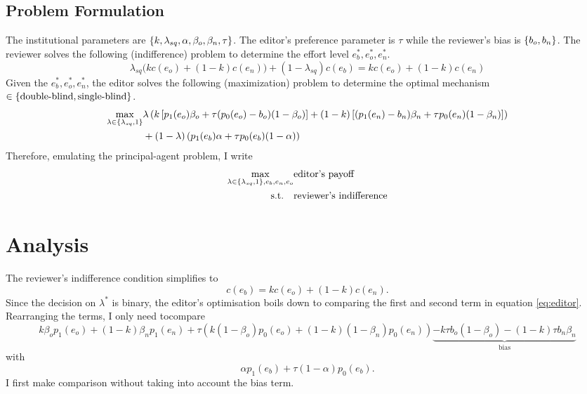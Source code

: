 \documentclass[12pt]{article}
\begin{document}
\subsection{Problem Formulation}
The institutional parameters are
$\left\{k,\lambda_{sq},\alpha,\beta_o,\beta_n,\tau\right\}$. The editor's preference
parameter is $\tau$ while the reviewer's bias is $\left\{b_o,b_n\right\}$. The reviewer
solves the following (indifference) problem to determine the effort level
$e_b^*,e_o^*,e_n^*$.
\begin{equation}
    \lambda_{sq} \big(k c(e_o) + (1-k) c(e_n)\big) + (1-\lambda_{sq}) c(e_b) = {k c(e_o) + (1-k) c(e_n)}
\end{equation}
Given the $e_b^*,e_o^*,e_n^*$, the editor solves the following (maximization)
problem to determine the optimal mechanism $\in
    \left\{\text{double-blind},\text{single-blind}\right\}$.
\begin{equation}
    \begin{split}\label{eq:editor}
        \max_{\lambda \in \left\{\lambda_{sq},1\right\}} & \lambda\left(k \left[p_1(e_o)\beta_o+\tau (p_0(e_o)-b_o)(1-\beta_o)\right]+(1-k)\left[(p_1(e_n)-b_n)\beta_n+\tau p_0(e_n)(1-\beta_n)\right] \right) \\
                                                & +(1-\lambda)\left(p_1(e_b)\alpha+\tau p_0(e_b)(1-\alpha)\right)                                                                       \\
    \end{split}
\end{equation}
Therefore, emulating the principal-agent problem, I write
\begin{equation}\label{eq:combined}
    \begin{split}
        \max_{\lambda \in \left\{\lambda_{sq},1\right\},e_b,e_n,e_o} & \text{editor's payoff}         \\
        \text{s.t.} \quad                                   & \text{reviewer's indifference}
    \end{split}
\end{equation}

\section{Analysis} \label{sec:analysis}
The reviewer's indifference condition simplifies to
\begin{equation*}
    c(e_b) =  k c(e_o) + (1-k) c(e_n).
\end{equation*}
Since the decision on $\lambda^*$ is binary, the editor's optimisation boils down to comparing the first and second term  in equation \ref{eq:editor}.
Rearranging the terms, I only need tocompare
\[ k\beta_o p_1(e_o) + (1-k)\beta_n p_1(e_n) + \tau(k(1-\beta_o)p_0(e_o) + (1-k)(1-\beta_n)p_0(e_n))\underbrace{-k\tau b_o(1-\beta_o) - (1-k)\tau b_n\beta_n }_{\text{bias}}\]
with \[\alpha p_1(e_b) + \tau(1-\alpha)p_0(e_b).\]
I first make comparison without taking into account the bias term.
\end{document}
